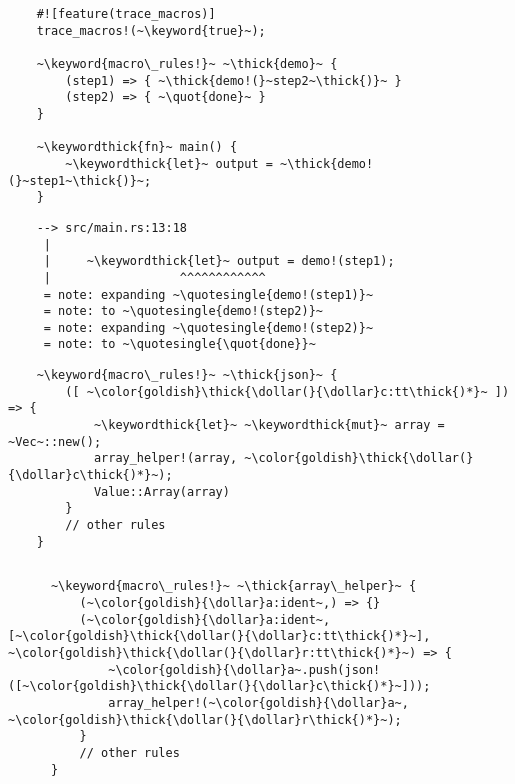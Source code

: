 \documentclass[usepdftitle=false]{beamer}
\newcommand{\dollar}{\makebox[\widthof{\$}][c]{\$}}
\newcommand{\thick}[1]{\contourlength{0.16pt}\contour[10]{black}{#1}}
\newcommand{\slantbox}[2][.5]
  {%
    \mbox
      {%
        \sbox{\foobox}{#2}%
        \hskip\wd\foobox
        \pdfsave
        \pdfsetmatrix{1 0 #1 1}%
        \llap{\usebox{\foobox}}%
        \pdfrestore
      }%
  }
\newcommand{\backslantbox}[2][.5]
  {%
    \mbox
      {%
        \sbox{\foobox}{#2}%
        \hskip\wd\foobox
        \pdfsave
        \pdfsetmatrix{-1 0 #1 1}%
        \llap{\usebox{\foobox}}%
        \pdfrestore
      }%
  }
\newcommand{\openquote}{\backslantbox[.2]{\hspace{11pt}''\hspace{-11pt}}}
\newcommand{\closequote}{\slantbox[-.2]{\hspace{2pt}''\hspace{-2pt}}}
\newcommand{\openquotesingle}{\backslantbox[.2]{\hspace{11pt}'\hspace{-11pt}}}
\newcommand{\closequotesingle}{\slantbox[-.2]{\hspace{2pt}'\hspace{-2pt}}}
\newcommand{\blackquote}[1]{\openquote#1\closequote}
\newcommand{\quot}[1]{{\color{redish}\blackquote{#1}}}
\newcommand{\quotesingle}[1]{\openquotesingle#1\closequotesingle}
\newcommand{\keyword}[1]{\color{greenish}#1}
\newcommand{\keywordthick}[1]{\color{greenish}\contourlength{0.20pt}\contour[10]{greenish}{#1}}
\begin{document}
\begin{frame}
\end{frame}

\begin{frame}[fragile]
  \begin{verbatim}
    #![feature(trace_macros)]
    trace_macros!(~\keyword{true}~);

    ~\keyword{macro\_rules!}~ ~\thick{demo}~ {
        (step1) => { ~\thick{demo!(}~step2~\thick{)}~ }
        (step2) => { ~\quot{done}~ }
    }

    ~\keywordthick{fn}~ main() {
        ~\keywordthick{let}~ output = ~\thick{demo!(}~step1~\thick{)}~;
    }
  \end{verbatim}
\end{frame}

\begin{frame}[fragile]
  \begin{verbatim}
    --> src/main.rs:13:18
     |
     |     ~\keywordthick{let}~ output = demo!(step1);
     |                  ^^^^^^^^^^^^
     = note: expanding ~\quotesingle{demo!(step1)}~
     = note: to ~\quotesingle{demo!(step2)}~
     = note: expanding ~\quotesingle{demo!(step2)}~
     = note: to ~\quotesingle{\quot{done}}~
  \end{verbatim}
\end{frame}

\begin{frame}[fragile]
  \begin{verbatim}
    ~\keyword{macro\_rules!}~ ~\thick{json}~ {
        ([ ~\color{goldish}\thick{\dollar(}{\dollar}c:tt\thick{)*}~ ]) => {
            ~\keywordthick{let}~ ~\keywordthick{mut}~ array = ~Vec~::new();
            array_helper!(array, ~\color{goldish}\thick{\dollar(}{\dollar}c\thick{)*}~);
            Value::Array(array)
        }
        // other rules
    }
  \end{verbatim}
\end{frame}

\begin{frame}[fragile]
  \begin{columns}
    \column{\dimexpr\paperwidth-30pt}
    \begin{verbatim}
      ~\keyword{macro\_rules!}~ ~\thick{array\_helper}~ {
          (~\color{goldish}{\dollar}a:ident~,) => {}
          (~\color{goldish}{\dollar}a:ident~, [~\color{goldish}\thick{\dollar(}{\dollar}c:tt\thick{)*}~], ~\color{goldish}\thick{\dollar(}{\dollar}r:tt\thick{)*}~) => {
              ~\color{goldish}{\dollar}a~.push(json!([~\color{goldish}\thick{\dollar(}{\dollar}c\thick{)*}~]));
              array_helper!(~\color{goldish}{\dollar}a~, ~\color{goldish}\thick{\dollar(}{\dollar}r\thick{)*}~);
          }
          // other rules
      }
    \end{verbatim}
  \end{columns}
\end{frame}
\end{document}
